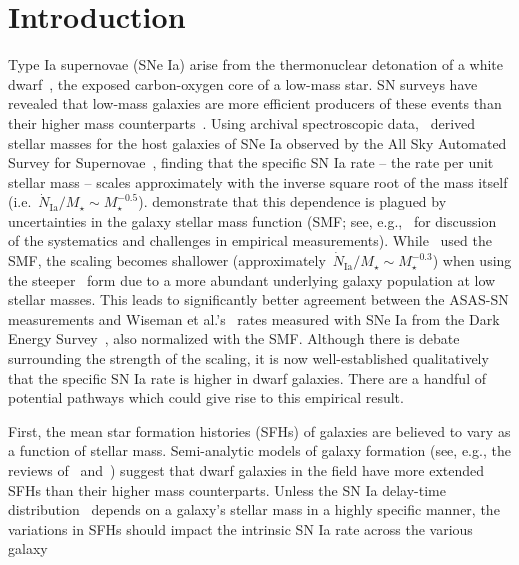 \documentclass[ms.tex]{subfiles}
\begin{document}
\section{Introduction}
\label{sec:intro}

Type Ia supernovae (SNe Ia) arise from the thermonuclear detonation of a white
dwarf~\citep[WD;][]{Hoyle1960, Colgate1969}, the exposed carbon-oxygen core of
a low-mass star.
SN surveys have revealed that low-mass galaxies are more efficient producers
of these events than their higher mass counterparts~\citep[e.g.][]{Mannucci2005,
Sullivan2006, Smith2012}.
Using archival spectroscopic data,~\citet{Brown2019} derived stellar masses for
the host galaxies of SNe Ia observed by the All Sky Automated Survey for
Supernovae~\citep[ASAS-SN;][]{Shappee2014, Kochanek2017}, finding that the
specific SN Ia rate -- the rate per unit stellar mass -- scales approximately
with the inverse square root of the mass itself (i.e.~$\dot{N}_\text{Ia} /
M_\star \sim M_\star^{-0.5}$).
\citet{Gandhi2022} demonstrate that this dependence is plagued by uncertainties
in the galaxy stellar mass function (SMF; see, e.g.,~\citealp*{Weigel2016} for
discussion of the systematics and challenges in empirical measurements).
While~\citet{Brown2019} used the~\citet{Bell2003} SMF, the scaling becomes
shallower (approximately~$\dot{N}_\text{Ia} / M_\star \sim M_\star^{-0.3}$)
when using the steeper~\citet{Baldry2012} form due to a more abundant
underlying galaxy population at low stellar masses.
This leads to significantly better agreement between the ASAS-SN measurements
and Wiseman et al.'s~\citeyearpar{Wiseman2021} rates measured with SNe Ia from
the Dark Energy Survey~\citep[DES;][]{DES2016}, also normalized with the
\citet{Baldry2012} SMF.
Although there is debate surrounding the strength of the scaling, it is now
well-established qualitatively that the specific SN Ia rate is higher in dwarf
galaxies.
There are a handful of potential pathways which could give rise to this
empirical result.
\par
First, the mean star formation histories (SFHs) of galaxies are believed to
vary as a function of stellar mass. Semi-analytic models of galaxy formation
(see, e.g., the reviews of~\citealp{Baugh2006} and~\citealp{Somerville2015a})
suggest that dwarf galaxies in the field have more extended SFHs than their
higher mass counterparts.
Unless the SN Ia delay-time distribution~\citep[DTD; e.g.,][]{Maoz2012a}
depends on a galaxy's stellar mass in a highly specific manner, the variations
in SFHs should impact the intrinsic SN Ia rate across the various galaxy
\end{document}
